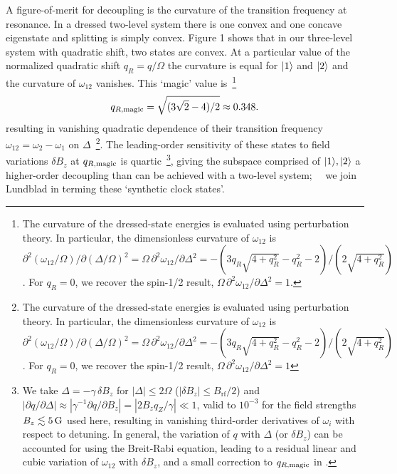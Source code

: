 \documentclass[aps,prl,reprint,superscriptaddress,floatfix]{revtex4-1}
\begin{document}
A figure-of-merit for decoupling is the curvature of the transition frequency at resonance.
In a dressed two-level system there is one convex and one concave eigenstate and splitting is simply convex.
Figure 1 shows that in our three-level system with quadratic shift, two states are convex.
At a particular value of the normalized quadratic shift $q_R=q/\Omega$ the curvature is equal for $\vert 1 \rangle $ and $\vert 2 \rangle $ and the curvature of $\omega_{12}$ vanishes.
This `magic' value is~\footnote{
  The curvature of the dressed-state energies is evaluated using perturbation theory. In particular, the dimensionless curvature of $\omega_{12}$ is $\partial^2(\omega_{12}/\Omega)/\partial(\Delta/\Omega)^2 = \Omega \, \partial^2\omega_{12}/\partial \Delta^2 = -(3 q_R \sqrt{4 + q_R^2} - q_R^2 - 2)/(2 \sqrt{4 + q_R^2})$. For $q_R = 0$, we recover the spin-1/2 result, $\Omega\, \partial^2\omega_{12}/\partial \Delta^2 = 1$.}
\begin{align}
\label{eq:qRmagic}
    q_{R,\text{magic}} = \sqrt{(3\sqrt{2} - 4)/2} \approx 0.348.
\end{align}
resulting in vanishing quadratic dependence of their transition frequency $\omega_{12}=\omega_2 - \omega_1$ on $\Delta$~\footnote{
    The curvature of the dressed-state energies is evaluated using perturbation theory. In particular, the dimensionless curvature of $\omega_{12}$ is $\partial^2(\omega_{12}/\Omega)/\partial(\Delta/\Omega)^2 = \Omega \, \partial^2\omega_{12}/\partial \Delta^2 = -(3 q_R \sqrt{4 + q_R^2} - q_R^2 - 2)/(2 \sqrt{4 + q_R^2})$.
    For $q_R = 0$, we recover the spin-1/2 result, $\Omega\, \partial^2\omega_{12}/\partial \Delta^2 = 1$}.
The leading-order sensitivity of these states to field variations $\delta B_z$ at $q_{R,\text{magic}}$ is quartic~\footnote{
    We take $\Delta = -\gamma \, \delta B_z$ for $|\Delta | \leq 2\Omega$ ($| \delta B_z | \leq B_{\text{rf}}/2$) and $| \partial q / \partial \Delta | \approx | \gamma^{-1} \partial q / \partial B_z | = |2 B_z q_Z / \gamma| \ll 1$, valid to $10^{-3}$ for the field strengths $B_z \lesssim \unit[5]{G}$ used here, resulting in vanishing third-order derivatives of $\omega_i$ with respect to detuning. 
    In general, the variation of $q$ with $\Delta$ (or $\delta B_z$) can be accounted for using the Breit-Rabi equation, leading to a residual linear and cubic variation of $\omega_{12}$ with $\delta B_z$, and a small correction to $q_{R,\text{magic}}$ in .},
giving the subspace comprised of ${\vert 1 \rangle ,\vert 2 \rangle }$ a higher-order decoupling than can be achieved with a two-level system;~~
we join Lundblad \etal in terming these `synthetic clock states'. 
\end{document}
